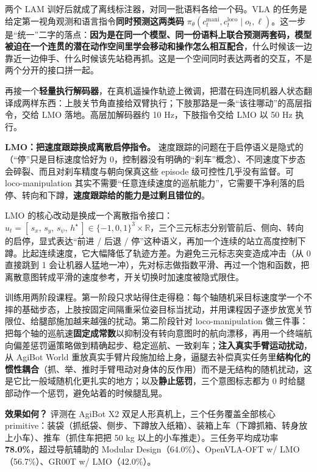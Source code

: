 \documentclass[
  chinese,
]{ctexart}
\begin{document}
两个 LAM 训好后就成了离线标注器，对同一批语料各给一个码。VLA
的任务是给定第一视角观测和语言指令\textbf{同时预测这两类码}
\(\pi_\theta(c_t^{\mathrm{mani}}, c_t^{\mathrm{loco}} \mid o_t, \ell)\)。这一步是``统一''二字的落点：\textbf{因为是在同一个模型、同一份语料上联合预测两套码，模型被迫在一个连贯的潜在动作空间里学会移动和操作怎么相互配合}，什么时候该一边靠近一边伸手、什么时候该先站稳再抓。这是一个空间同时表达两者的交互，不是两个分开的接口拼一起。

再接一个\textbf{轻量执行解码器}，在真机遥操作轨迹上微调，把潜在码连同机器人状态翻译成两样东西：上肢关节角直接给双臂执行；下肢那路是一条``该往哪动''的高层指令，交给
LMO 落地。高层加解码器约 10 Hz，下肢指令交给 LMO 以 50 Hz 执行。

\textbf{LMO：把速度跟踪换成离散启停指令。}
速度跟踪的问题在于启停语义是隐式的（``停''只是目标速度恰好为
0，控制器没有明确的``刹车''概念）、不同速度下步态会碎裂、而且对刹车精度与朝向保真这些
episode 级可控性几乎没有监督。可 loco-manipulation
其实不需要``任意连续速度的巡航能力''，它需要干净利落的启停、转向和下蹲，\textbf{速度跟踪给的能力是过剩且错位的}。

LMO
的核心改动是换成一个离散指令接口：\(u_t = [\,s_x,\, s_y,\, s_\psi,\, h^\star\,] \in \{-1,0,1\}^3 \times \mathbb{R}\)，三个三元标志分别管前后、侧向、转向的启停，显式表达``前进
/ 后退 /
停''这种语义，再加一个连续的站立高度控制下蹲。比起连续速度，它大幅降低了轨迹方差。为避免三元标志突变造成冲击（从
0 直接跳到 1
会让机器人猛地一冲），先对标志做指数平滑、再过一个饱和函数，把离散意图转成平滑的速度参考，开关切换时加速度被隐式限住。

训练用两阶段课程。第一阶段只求站得住走得稳：每个轴随机采目标速度学一个不摔的基础步态，上肢按固定间隔重采位姿目标当扰动，并用课程因子逐步放宽关节限位、给腿部施加越来越强的扰动。第二阶段针对
loco-manipulation
做三件事：把每个轴的巡航速\textbf{固定成常数}以抑制没有转向意图时的航向漂移，再用一个终端航向偏差惩罚逼策略做到精确起步、稳定巡航、一致刹车；\textbf{注入真实手臂运动扰动}，从
AgiBot World
重放真实手臂片段施加给上身，逼腿去补偿真实任务里\textbf{结构化的惯性耦合}（抓、举、推时手臂甩动对身体的反作用）而不是无结构的随机扰动，这是它比一般域随机化更扎实的地方；以及\textbf{静止惩罚}，三个意图标志都为
0 时给腿部动作一个惩罚，避免站着的时候腿乱晃。

\textbf{效果如何？} 评测在 AgiBot X2
双足人形真机上，三个任务覆盖全部核心
primitive：装袋（抓纸袋、侧步、下蹲放入纸箱）、装箱上车（下蹲抓箱、转身放上小车）、推车（抓住车把把
50 kg 以上的小车推走）。三任务平均成功率 \textbf{78.0\%}，超过导航辅助的
Modular Design（64.0\%）、OpenVLA-OFT w/ LMO（56.7\%）、GR00T w/
LMO（42.0\%）。
\end{document}
